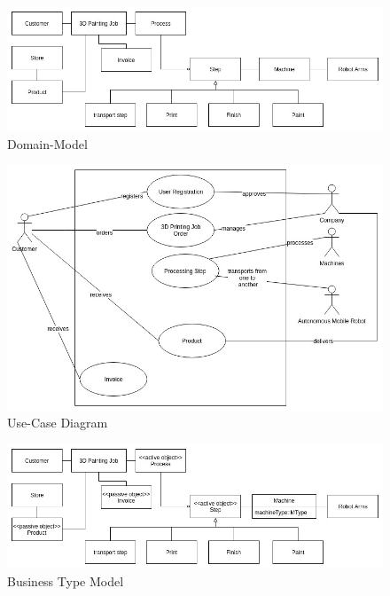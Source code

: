 \documentclass[aspectratio=1610,onlymath]{beamer}
\begin{document}
\begin{frame}
\begin{figure}[ht]
\centering
\includegraphics[width=1\textwidth]{01_domain-model}
\caption{Domain-Model}
\end{figure}
\end{frame}

\begin{frame}
\begin{figure}[ht]
\centering
\includegraphics[width=.9\textwidth]{02_use-case}
\caption{Use-Case Diagram}
\end{figure}
\end{frame}

\begin{frame}
\begin{figure}[ht]
\centering
\includegraphics[width=1\textwidth]{03_business-type-model}
\caption{Business Type Model}
\end{figure}
\end{frame}
\end{document}

